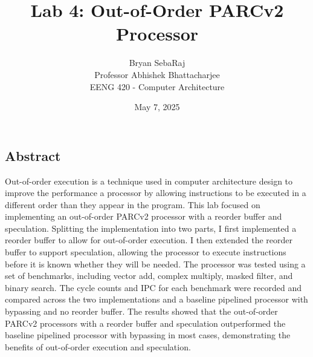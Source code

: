 \documentclass[11pt]{article}
\title{Lab 4: Out-of-Order PARCv2 Processor}
\author{Bryan SebaRaj \\[0.5em] Professor Abhishek Bhattacharjee \\[0.5em] EENG 420 - Computer Architecture}
\date{May 7, 2025}
\begin{document}
\maketitle


\subsection*{Abstract}

Out-of-order execution is a technique used in computer architecture design to improve the performance  
a processor by allowing instructions to be executed in a different order than they appear in the program.
This lab focused on implementing an out-of-order PARCv2 processor with a reorder buffer and speculation.
Splitting the implementation into two parts, I first implemented a reorder buffer to allow for out-of-order execution.
I then extended the reorder buffer to support speculation, allowing the processor to 
execute instructions before it is known whether they will be needed.
The processor was tested using a set of benchmarks, including vector add, complex multiply,
masked filter, and binary search. The cycle counts and IPC for each benchmark were recorded and
compared across the two implementations and a baseline pipelined processor with bypassing and no reorder buffer.
The results showed that the out-of-order PARCv2 processors with a reorder buffer and speculation outperformed 
the baseline pipelined processor with bypassing in most cases, demonstrating the benefits of out-of-order execution and speculation.
\end{document}
